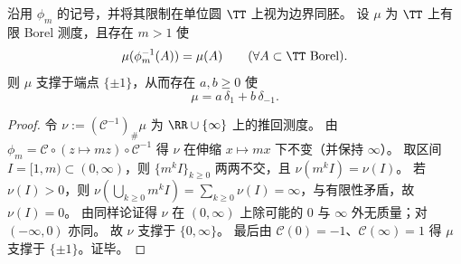 \begin{proposition}[伸缩不变有限测度的端点原子化]\label{prop:xi-cayley-dilation-invariant-measure-endpoint-atomic}
沿用 \(\phi_m\) 的记号，并将其限制在单位圆 \(\TT\) 上视为边界同胚。
设 \(\mu\) 为 \(\TT\) 上有限 Borel 测度，且存在 \(m>1\) 使
\[
\mu(\phi_m^{-1}(A))=\mu(A)\qquad(\forall A\subset\TT\ \text{Borel}).
\]
则 \(\mu\) 支撑于端点 \(\{\pm 1\}\)，从而存在 \(a,b\ge 0\) 使
\[
\mu=a\,\delta_{1}+b\,\delta_{-1}.
\]
\end{proposition}
\begin{proof}
令 \(\nu:=(\mathcal{C}^{-1})_{\#}\mu\) 为 \(\RR\cup\{\infty\}\) 上的推回测度。
由 \(\phi_m=\mathcal{C}\circ(z\mapsto mz)\circ\mathcal{C}^{-1}\) 得 \(\nu\) 在伸缩 \(x\mapsto mx\) 下不变（并保持 \(\infty\)）。
取区间 \(I=[1,m)\subset(0,\infty)\)，则 \(\{m^k I\}_{k\ge 0}\) 两两不交，且 \(\nu(m^k I)=\nu(I)\)。
若 \(\nu(I)>0\)，则
\(
\nu(\bigcup_{k\ge 0}m^k I)=\sum_{k\ge 0}\nu(I)=\infty
\)，与有限性矛盾，故 \(\nu(I)=0\)。
由同样论证得 \(\nu\) 在 \((0,\infty)\) 上除可能的 \(0\) 与 \(\infty\) 外无质量；对 \((-\infty,0)\) 亦同。
故 \(\nu\) 支撑于 \(\{0,\infty\}\)。
最后由 \(\mathcal{C}(0)=-1\)、\(\mathcal{C}(\infty)=1\) 得 \(\mu\) 支撑于 \(\{\pm 1\}\)。证毕。
\end{proof}

\endinput
